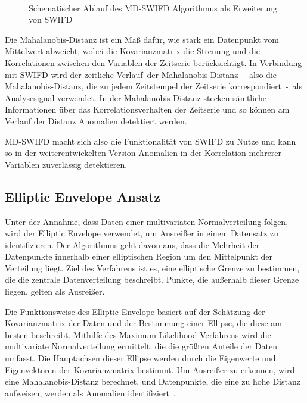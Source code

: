 \begin{figure}[t!]
    \caption{Schematischer Ablauf des MD-SWIFD Algorithmus als Erweiterung von SWIFD}
~\label{fig:md_swifd_schema}
\end{figure}

Die Mahalanobis-Distanz ist ein Maß dafür, wie stark ein Datenpunkt vom Mittelwert abweicht, wobei die Kovarianzmatrix die Streuung und die Korrelationen
zwischen den Variablen der Zeitserie berücksichtigt. In Verbindung mit SWIFD wird der \glqq zeitliche Verlauf\grqq~der Mahalanobis-Distanz~-~also die
Mahalanobis-Distanz, die zu jedem Zeitstempel der Zeitserie korrespondiert~-~als Analysesignal verwendet. In der Mahalanobis-Distanz stecken sämtliche
Informationen über das Korrelationsverhalten der Zeitserie und so können am Verlauf der Distanz Anomalien detektiert werden.

MD-SWIFD macht sich also die Funktionalität von SWIFD zu Nutze und kann so in der weiterentwickelten Version Anomalien in der Korrelation mehrerer Variablen
zuverlässig detektieren.

\subsection{Elliptic Envelope Ansatz}
Unter der Annahme, dass Daten einer multivariaten Normalverteilung folgen, wird der Elliptic Envelope verwendet, um Ausreißer in einem Datensatz zu
identifizieren. Der Algorithmus geht davon aus, dass die Mehrheit der Datenpunkte innerhalb einer elliptischen Region um den Mittelpunkt der Verteilung
liegt. Ziel des Verfahrens ist es, eine elliptische Grenze zu bestimmen, die die zentrale Datenverteilung beschreibt. Punkte, die außerhalb dieser Grenze
liegen, gelten als Ausreißer.

Die Funktionsweise des Elliptic Envelope basiert auf der Schätzung der Kovarianzmatrix der Daten und der Bestimmung einer Ellipse, die diese am besten
beschreibt. Mithilfe des Maximum-Likelihood-Verfahrens wird die multivariate Normalverteilung ermittelt, die die größten Anteile der Daten umfasst. Die
Hauptachsen dieser Ellipse werden durch die Eigenwerte und Eigenvektoren der Kovarianzmatrix bestimmt. Um Ausreißer zu erkennen, wird eine
Mahalanobis-Distanz berechnet, und Datenpunkte, die eine zu hohe Distanz aufweisen, werden als Anomalien identifiziert~\cite{Ashrafuzzaman2020}.

